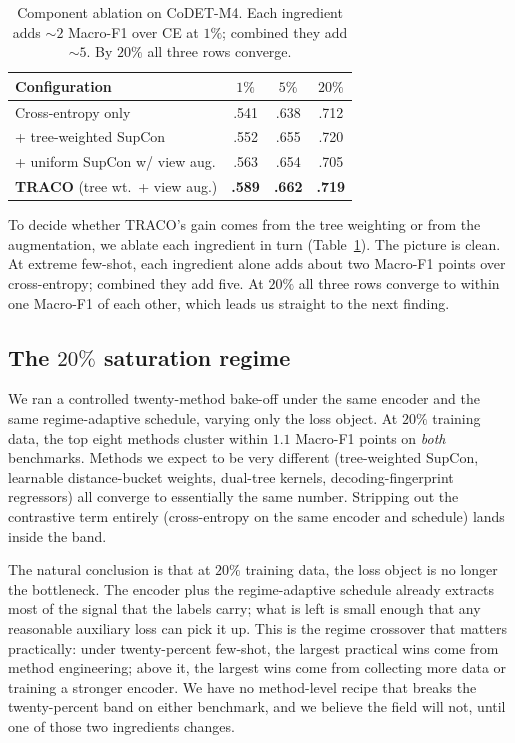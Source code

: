 ﻿\documentclass[11pt]{article}
\newcommand{\method}{\textsc{TRACO}\xspace}
\begin{document}
\begin{table}[t]
\centering\footnotesize
\setlength{\tabcolsep}{3pt}
\begin{tabular}{@{}p{} ccc@{}}
\toprule
\textbf{Configuration} & $1\%$ & $5\%$ & $20\%$ \\
\midrule
Cross-entropy only                       & .541 & .638 & .712 \\
+ tree-weighted SupCon                   & .552 & .655 & .720 \\
+ uniform SupCon w/ view aug.            & .563 & .654 & .705 \\
\textbf{\method} (tree wt.\ + view aug.) & \textbf{.589} & \textbf{.662} & \textbf{.719} \\
\bottomrule
\end{tabular}
\caption{\label{tab:ablation}
Component ablation on CoDET-M4. Each ingredient adds $\sim\!2$
Macro-F1 over CE at $1\%$; combined they add $\sim\!5$. By $20\%$
all three rows converge.}
\end{table}

To decide whether \method's gain comes from the tree weighting or
from the augmentation, we ablate each ingredient in turn
(Table~\ref{tab:ablation}). The picture is clean. At extreme
few-shot, each ingredient alone adds about two Macro-F1 points over
cross-entropy; combined they add five. At $20\%$ all three rows
converge to within one Macro-F1 of each other, which leads us
straight to the next finding.

\subsection{The \texorpdfstring{$20\%$}{20\%} saturation regime}
\label{sec:saturation}

We ran a controlled twenty-method bake-off under the same encoder
and the same regime-adaptive schedule, varying only the loss object.
At $20\%$ training data, the top eight methods cluster within $1.1$
Macro-F1 points on \emph{both} benchmarks. Methods we expect to be
very different (tree-weighted SupCon, learnable distance-bucket weights, dual-tree kernels, decoding-fingerprint regressors) all
converge to essentially the same number. Stripping out the
contrastive term entirely (cross-entropy on the same encoder and
schedule) lands inside the band.

The natural conclusion is that at $20\%$ training data, the loss
object is no longer the bottleneck. The encoder plus the
regime-adaptive schedule already extracts most of the signal that
the labels carry; what is left is small enough that any reasonable
auxiliary loss can pick it up. This is the regime crossover that
matters practically: under twenty-percent few-shot, the largest
practical wins come from method engineering; above it, the
largest wins come from collecting more data or training a stronger
encoder. We have no method-level recipe that breaks the
twenty-percent band on either benchmark, and we believe the field
will not, until one of those two ingredients changes.
\end{document}
